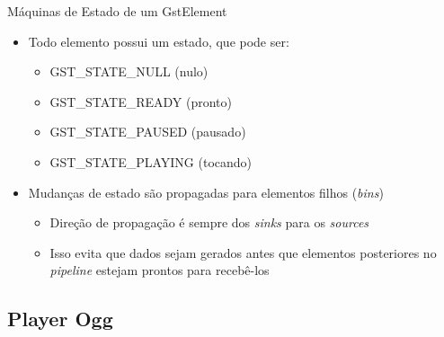 \documentclass{beamer}
\def\en#1{\foreignlanguage{english}{\emph{#1}}}
\begin{document}
\begin{frame}[c]{Máquinas de Estado de um GstElement}
  \begin{itemize}
    \item Todo elemento possui um estado, que pode ser:
      \begin{itemize}
        \item GST\_STATE\_NULL (nulo)
        \item GST\_STATE\_READY (pronto)
        \item GST\_STATE\_PAUSED (pausado)
        \item GST\_STATE\_PLAYING (tocando)
      \end{itemize}
    \item Mudanças de estado são propagadas para elementos filhos
      (\en{bins})
      \begin{itemize}
      \item Direção de propagação é sempre dos \en{sinks} para os
        \en{sources}
      \item Isso evita que dados sejam gerados antes que elementos
        posteriores no \en{pipeline} estejam prontos para recebê-los
      \end{itemize}
  \end{itemize}

  \begin{figure}[h]
    \centering
  \end{figure}
\end{frame}

\subsection{Player Ogg}
\end{document}
